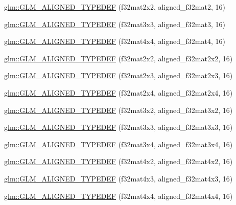 \begin{DoxyCompactItemize}
\item 
\hyperlink{group__gtx__type__aligned_ga65ff0d690a34a4d7f46f9b2eb51525ee}{glm\-::\-G\-L\-M\-\_\-\-A\-L\-I\-G\-N\-E\-D\-\_\-\-T\-Y\-P\-E\-D\-E\-F} (f32mat2x2, aligned\-\_\-f32mat2, 16)
\item 
\hyperlink{group__gtx__type__aligned_gadd8ddbe2bf65ccede865ba2f510176dc}{glm\-::\-G\-L\-M\-\_\-\-A\-L\-I\-G\-N\-E\-D\-\_\-\-T\-Y\-P\-E\-D\-E\-F} (f32mat3x3, aligned\-\_\-f32mat3, 16)
\item 
\hyperlink{group__gtx__type__aligned_gaf18dbff14bf13d3ff540c517659ec045}{glm\-::\-G\-L\-M\-\_\-\-A\-L\-I\-G\-N\-E\-D\-\_\-\-T\-Y\-P\-E\-D\-E\-F} (f32mat4x4, aligned\-\_\-f32mat4, 16)
\item 
\hyperlink{group__gtx__type__aligned_ga66339f6139bf7ff19e245beb33f61cc8}{glm\-::\-G\-L\-M\-\_\-\-A\-L\-I\-G\-N\-E\-D\-\_\-\-T\-Y\-P\-E\-D\-E\-F} (f32mat2x2, aligned\-\_\-f32mat2x2, 16)
\item 
\hyperlink{group__gtx__type__aligned_ga1558a48b3934011b52612809f443e46d}{glm\-::\-G\-L\-M\-\_\-\-A\-L\-I\-G\-N\-E\-D\-\_\-\-T\-Y\-P\-E\-D\-E\-F} (f32mat2x3, aligned\-\_\-f32mat2x3, 16)
\item 
\hyperlink{group__gtx__type__aligned_gaa52e5732daa62851627021ad551c7680}{glm\-::\-G\-L\-M\-\_\-\-A\-L\-I\-G\-N\-E\-D\-\_\-\-T\-Y\-P\-E\-D\-E\-F} (f32mat2x4, aligned\-\_\-f32mat2x4, 16)
\item 
\hyperlink{group__gtx__type__aligned_gac09663c42566bcb58d23c6781ac4e85a}{glm\-::\-G\-L\-M\-\_\-\-A\-L\-I\-G\-N\-E\-D\-\_\-\-T\-Y\-P\-E\-D\-E\-F} (f32mat3x2, aligned\-\_\-f32mat3x2, 16)
\item 
\hyperlink{group__gtx__type__aligned_ga3f510999e59e1b309113e1d561162b29}{glm\-::\-G\-L\-M\-\_\-\-A\-L\-I\-G\-N\-E\-D\-\_\-\-T\-Y\-P\-E\-D\-E\-F} (f32mat3x3, aligned\-\_\-f32mat3x3, 16)
\item 
\hyperlink{group__gtx__type__aligned_ga2c9c94f0c89cd71ce56551db6cf4aaec}{glm\-::\-G\-L\-M\-\_\-\-A\-L\-I\-G\-N\-E\-D\-\_\-\-T\-Y\-P\-E\-D\-E\-F} (f32mat3x4, aligned\-\_\-f32mat3x4, 16)
\item 
\hyperlink{group__gtx__type__aligned_ga99ce8274c750fbfdf0e70c95946a2875}{glm\-::\-G\-L\-M\-\_\-\-A\-L\-I\-G\-N\-E\-D\-\_\-\-T\-Y\-P\-E\-D\-E\-F} (f32mat4x2, aligned\-\_\-f32mat4x2, 16)
\item 
\hyperlink{group__gtx__type__aligned_ga9476ef66790239df53dbe66f3989c3b5}{glm\-::\-G\-L\-M\-\_\-\-A\-L\-I\-G\-N\-E\-D\-\_\-\-T\-Y\-P\-E\-D\-E\-F} (f32mat4x3, aligned\-\_\-f32mat4x3, 16)
\item 
\hyperlink{group__gtx__type__aligned_gacc429b3b0b49921e12713b6d31e14e1d}{glm\-::\-G\-L\-M\-\_\-\-A\-L\-I\-G\-N\-E\-D\-\_\-\-T\-Y\-P\-E\-D\-E\-F} (f32mat4x4, aligned\-\_\-f32mat4x4, 16)

\end{DoxyCompactItemize}
